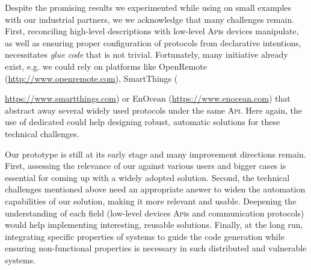 Despite the promising results we experimented while using \IOTDSL on small examples with our industrial partners, we we acknowledge that many challenges remain. First, reconciling high-level descriptions with low-level \textsc{Api}s devices manipulate, as well as ensuring proper configuration of protocols from declarative intentions, necessitates \emph{glue code} that is not trivial. Fortunately, many initiative already exist, e.g. we could rely on platforms like OpenRemote (\url{http://www.openremote.com}), SmartThings ({\url{https://www.smartthings.com}) or EnOcean (\url{https://www.enocean.com}) that abstract away several widely used protocols under the same \textsc{Api}. Here again, the use of dedicated \DSLS
 could help designing robust, automatic solutions for these technical challenges.

Our prototype is still at its early stage and many improvement directions remain. First, assessing the relevance of our \DSL against various users and bigger cases is essential for coming up with a widely adopted solution. Second, the technical challenges mentioned above need an appropriate answer to widen the automation capabilities of our solution, making it more relevant and usable. Deepening the understanding of each field (low-level devices \textsc{Api}s and communication protocols) would help implementing interesting, reusable solutions. Finally, at the long run, integrating specific properties of \IOT systems to guide the code generation while ensuring non-functional properties is necessary in such distributed and vulnerable \IOT systems.


}
